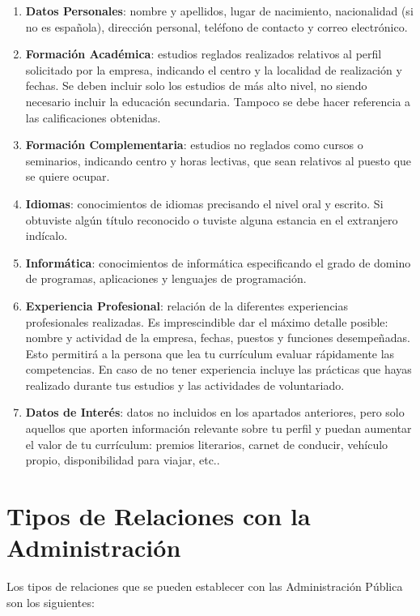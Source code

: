 \begin{enumerate}
    \item \textbf{Datos Personales}: nombre y apellidos, lugar de nacimiento, nacionalidad (si no es española), dirección personal, teléfono de contacto y correo electrónico.

    \item \textbf{Formación Académica}: estudios reglados realizados relativos al perfil solicitado por la empresa, indicando el centro y la localidad de realización y fechas. Se deben incluir solo los estudios de más alto nivel, no siendo necesario incluir la educación secundaria. Tampoco se debe hacer referencia a las calificaciones obtenidas.

    \item \textbf{Formación Complementaria}: estudios no reglados como cursos o seminarios, indicando centro y horas lectivas, que sean relativos al puesto que se quiere ocupar.

    \item \textbf{Idiomas}: conocimientos de idiomas precisando el nivel oral y escrito. Si obtuviste algún título reconocido o tuviste alguna estancia en el extranjero indícalo.

    \item \textbf{Informática}: conocimientos de informática especificando el grado de domino de programas, aplicaciones y lenguajes de programación.

    \item \textbf{Experiencia Profesional}: relación de la diferentes experiencias profesionales realizadas. Es imprescindible dar el máximo detalle posible: nombre y actividad de la empresa, fechas, puestos y funciones desempeñadas. Esto permitirá a la persona que lea tu currículum evaluar rápidamente las competencias. En caso de no tener experiencia incluye las prácticas que hayas realizado durante tus estudios y las actividades de voluntariado.

    \item \textbf{Datos de Interés}: datos no incluidos en los apartados anteriores, pero solo aquellos que aporten información relevante sobre tu perfil y puedan aumentar el valor de tu currículum: premios literarios, carnet de conducir, vehículo propio, disponibilidad para viajar, etc..
\end{enumerate}

\section{Tipos de Relaciones con la Administración}
Los tipos de relaciones que se pueden establecer con las Administración Pública son los siguientes:

